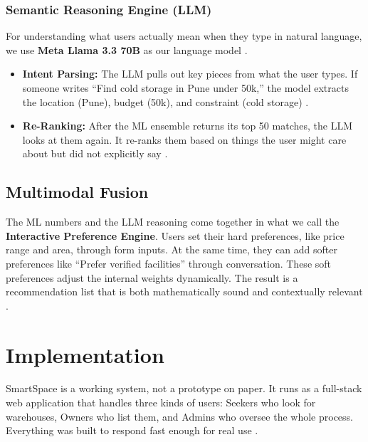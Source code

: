 \documentclass[pdflatex,sn-mathphys-num]{sn-jnl}
\theoremstyle{thmstyleone}
\theoremstyle{thmstyletwo}
\theoremstyle{thmstylethree}
\begin{document}
\subsubsection{Semantic Reasoning Engine (LLM)}%
\label{subsubsec:llm}

For understanding what users actually mean when they type
in natural language, we use \textbf{Meta Llama 3.3 70B}
as our language model \cite{b3, b7, b8}.
\begin{itemize}
    \item \textbf{Intent Parsing:}
      The LLM pulls out key pieces from what the user types.
      If someone writes ``Find cold storage in Pune under
      50k,'' the model extracts the location (Pune),
      budget (50k), and constraint (cold storage) \cite{b7}.

    \item \textbf{Re-Ranking:}
      After the ML ensemble returns its top 50 matches,
      the LLM looks at them again.
      It re-ranks them based on things the user might care
      about but did not explicitly say \cite{b4}.
\end{itemize}


\subsection{Multimodal Fusion}\label{subsec:fusion}

The ML numbers and the LLM reasoning come together in
what we call the \textbf{Interactive Preference Engine}.
Users set their hard preferences, like price range and area,
through form inputs.
At the same time, they can add softer preferences like
``Prefer verified facilities'' through conversation.
These soft preferences adjust the internal weights dynamically.
The result is a recommendation list that is both
mathematically sound and contextually relevant
\cite{b9, b4}.


\section{Implementation}\label{sec4}

SmartSpace is a working system, not a prototype on paper.
It runs as a full-stack web application that handles three
kinds of users: Seekers who look for warehouses, Owners
who list them, and Admins who oversee the whole process.
Everything was built to respond fast enough for real use
\cite{b6}.
\end{document}
